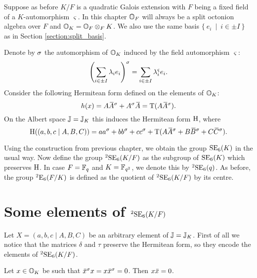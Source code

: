 Suppose as before $K / F$ is a quadratic Galois extension with $F$ being a fixed field of a
$K$-automorphism $\varsigma$. In this chapter $\mathbb{O}_F$ will always be a split octonion algebra 
over $F$ and $\mathbb{O}_K = \mathbb{O}_F \otimes_F K$. We also use the same basis 
$\{\ e_i\ \mid\ i \in \pm I\ \}$ as in Section \ref{section:split_basis}.

Denote by $\sigma$ the automorphism of $\mathbb{O}_K$ induced by the field automorphism 
$\varsigma$:
\begin{equation}
	\left( \sum_{i\in \pm I} \lambda_i e_i \right)^{\sigma} = 
	\sum_{i\in \pm I} \lambda_{i}^{\varsigma} e_i. 
\end{equation}
Consider the following Hermitean form defined on the elements of $\mathbb{O}_K$:
\begin{equation}
	h(x) = A \ovA^{\s} + A^{\s} \ovA = \Tr(A \ovA^{\s}).
\end{equation}
On the Albert space $\mathbb{J} = \mathbb{J}_K$ this induces the Hermitean form $\mathrm{H}$, where
\begin{equation}
	\H( (a,b,c\mid A,B,C) ) = 
		a a^{\s} + b b^{\s} + c c^{\s} + 
		\Tr(A \ovA^{\s} + B\ovB^{\s} + C\ovC^{\s}).
\end{equation}

Using the construction from previous chapter, we obtain the group $\mathrm{SE}_6(K)$ in the usual 
way. Now define the group ${}^2\mathrm{SE}_6(K/F)$ as the subgroup of $\mathrm{SE}_6(K)$ which preserves 
$\mathrm{H}$. In case $F = \mathbb{F}_q$ and $K = \mathbb{F}_{q^2}$, we denote this by ${}^2\mathrm{SE}_6(q)$. As before,
the group ${}^2\mathrm{E}_6(F/K)$ is defined as the quotient of ${}^2\mathrm{SE}_6(K/F)$ by its centre. 

\section{Some elements of ${}^2\mathrm{SE}_6(K/F)$}

Let $X = (a,b,c\mid A,B,C)$ be an arbitrary element of $\mathbb{J} = \mathbb{J}_K$. First of all we notice that 
the matrices $\delta$ and $\tau$ preserve the Hermitean form, so they encode the elements of 
${}^2\mathrm{SE}_6(K/F)$. 

\begin{lemma}
	\label{lemma:3_isotropic}
	Let $x \in \mathbb{O}_K$ be such that $\ovx^{\s} x = x \ovx^{\s} = 0$. Then $x\mathord{\mbox{\hspace*{0pt}}\,\overline{\!x\!\!\;}\!\:}\mbox{\hspace*{0pt}} = 0$.
\end{lemma}

